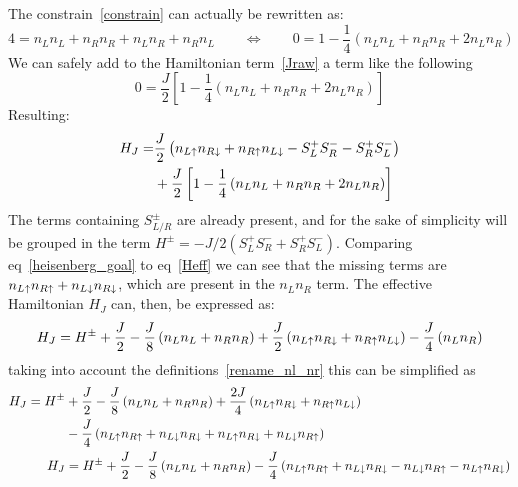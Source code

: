 The constrain~\eqref{constrain} can actually be rewritten as:
\begin{equation}
  4 = n_Ln_L + n_Rn_R + n_Ln_R + n_Rn_L \quad\quad\Leftrightarrow \quad\quad
  0 = 1-\frac{1}{4}\left(n_Ln_L + n_Rn_R + 2n_Ln_R\right)
\label{constrain2}
\end{equation}
We can safely add to the Hamiltonian term~\eqref{Jraw} a term like the following
\begin{equation*}
  0 = \frac{J}{2}\left[1-\frac{1}{4}\left(n_Ln_L + n_Rn_R + 2n_Ln_R\right)\right]
\end{equation*}
Resulting:
\begin{equation}
   \begin{split}
      H_{J} =& \frac{J}{2}\left(n_{L\uparrow}n_{R\downarrow} + n_{R\uparrow}n_{L\downarrow}-
         S^+_LS^-_R - S^+_RS^-_L \right)\\
             &+\frac{J}{2}\left[1-\frac{1}{4}\left(n_Ln_L + n_Rn_R + 2n_Ln_R\right)\right]
      \end{split}
\label{Heff}
\end{equation}
The terms containing $S^\pm_{L/R}$ are already present, and for the sake of simplicity will be grouped in the term $H^\pm = -J/2(S^+_LS^-_R + S^+_RS^-_L)$. Comparing eq~\eqref{heisenberg_goal} to eq~\eqref{Heff} we can see that the missing terms are $ n_{L\uparrow}n_{R\uparrow}+n_{L\downarrow}n_{R\downarrow} $, which are present in the $n_Ln_R$ term. The effective Hamiltonian $H_J$ can, then, be expressed as:
\begin{equation}
  H_{J} = H^\pm + \frac{J}{2} - \frac{J}{8}\left(n_Ln_L + n_Rn_R\right)+
    \frac{J}{2}\left(n_{L\uparrow}n_{R\downarrow} + n_{R\uparrow}n_{L\downarrow}\right)-
    \frac{J}{4}\left(n_Ln_R\right)
\end{equation}
taking into account the definitions~\eqref{rename_nl_nr} this can be simplified as
\begin{equation*}
  \begin{split}
     H_{J} = H^\pm &+ \frac{J}{2} - \frac{J}{8}\left(n_Ln_L + n_Rn_R\right)+
      \frac{2J}{4}\left(n_{L\uparrow}n_{R\downarrow} + n_{R\uparrow}n_{L\downarrow}\right)\\
      &-\frac{J}{4}\left(n_{L\uparrow}n_{R\uparrow} + n_{L\downarrow}n_{R\downarrow}+
                         n_{L\uparrow}n_{R\downarrow} + n_{L\downarrow}n_{R\uparrow}\right)\\
      H_{J} &= H^\pm + \frac{J}{2} - \frac{J}{8}\left(n_Ln_L + n_Rn_R\right)-
      \frac{J}{4}\left(n_{L\uparrow}n_{R\uparrow}+n_{L\downarrow}n_{R\downarrow}-
                        n_{L\downarrow}n_{R\uparrow}-n_{L\uparrow}n_{R\downarrow}\right)
    \end{split}
\end{equation*}
